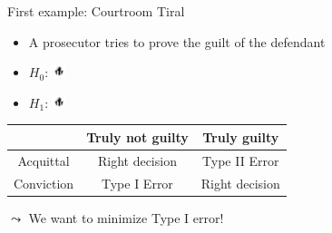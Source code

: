 \begin{frame}[c]{First example: Courtroom Tiral}

\begin{itemize}
\item A prosecutor tries to prove the guilt of the defendant
\item $H_0$: \includegraphics[height=1em]{images/hands} 
\item $H_1$: \includegraphics[height=1em]{images/hands} 
\pause
\end{itemize}

\medskip
\pause
\bigskip
\centering
\begin{tabular}{c|cc}
\toprule
& Truly not guilty 	& Truly guilty\\
\hline
Acquittal 	& Right decision	& Type II Error\\
Conviction & Type I Error		& Right decision\\
\bottomrule
\end{tabular}	

\bigskip
$\leadsto$ We want to minimize Type I error!

\end{frame}
